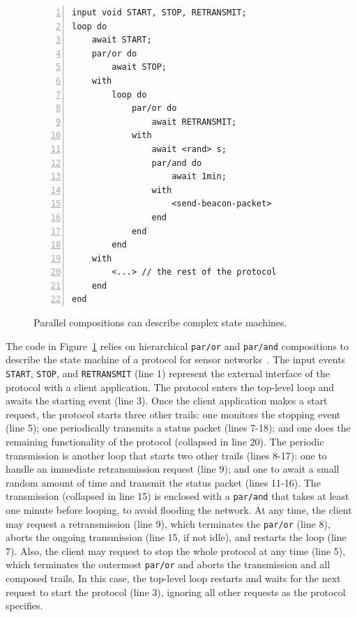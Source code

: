 \documentclass{acm_proc_article-sp}
\newcommand{\code}[1] {{\small{\texttt{#1}}}}
\newcommand{\1}{\;}
\newcommand{\2}{\;\;}
\newcommand{\3}{\;\;\;}
\newcommand{\5}{\;\;\;\;\;}
\begin{document}

\begin{figure}[t]
\begin{lstlisting}[numbers=left,xleftmargin=3em]
input void START, STOP, RETRANSMIT;
loop do
    await START;
    par/or do
        await STOP;
    with
        loop do
            par/or do
                await RETRANSMIT;
            with
                await <rand> s;
                par/and do
                    await 1min;
                with
                    <send-beacon-packet>
                end
            end
        end
    with
        <...> // the rest of the protocol
    end
end
\end{lstlisting}
\caption{ Parallel compositions can describe complex state machines.
\label{lst.ctp}
}
\end{figure}

The code in Figure~\ref{lst.ctp} relies on hierarchical \code{par/or} and 
\code{par/and} compositions to describe the state machine of a protocol for 
sensor networks~\cite{wsn.ctp,ceu.sensys13}.
%
The input events \code{START}, \code{STOP}, and \code{RETRANSMIT} (line 1) 
represent the external interface of the protocol with a client application.
%
The protocol enters the top-level loop and awaits the starting event (line 3).
Once the client application makes a start request, the protocol starts three 
other trails:
one monitors the stopping event (line 5);
one periodically transmits a status packet (lines 7-18);
and one does the remaining functionality of the protocol (collapsed in line 
20).
%
The periodic transmission is another loop that starts two other trails (lines 
8-17):
one to handle an immediate retransmission request (line 9);
and one to await a small random amount of time and transmit the status packet 
(lines 11-16).
%
The transmission (collapsed in line 15) is enclosed with a \code{par/and} that 
takes at least one minute before looping, to avoid flooding the network.
%
At any time, the client may request a retransmission (line 9), which terminates 
the \code{par/or} (line 8), aborts the ongoing transmission (line 15, if not 
idle), and restarts the loop (line 7).
%
Also, the client may request to stop the whole protocol at any time (line 5), 
which terminates the outermost \code{par/or} and aborts the transmission and 
all composed trails.
In this case, the top-level loop restarts and waits for the next request to 
start the protocol (line 3), ignoring all other requests as the protocol 
specifies.
\end{document}
